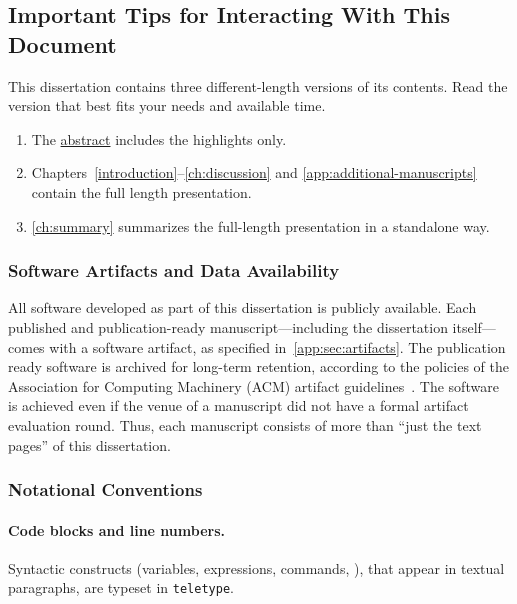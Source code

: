 \subsection{Important Tips for Interacting With This Document}
\label{subsec:tips}

This dissertation contains three different-length versions of its contents.
Read the version that best fits your needs and available time.

\begin{mdframed}[backgroundcolor=priorbase,linecolor=cc]
\begin{enumerate}[wide, labelwidth=!, labelindent=0pt]
\item The \hyperref[abs]{abstract} includes the highlights only.
\item Chapters~\ref{introduction}--\ref{ch:discussion} and \ref{app:additional-manuscripts} contain the full length presentation.
\item \autoref{ch:summary} summarizes the full-length presentation in a standalone way.
\end{enumerate}
\end{mdframed}

\subsubsection{Software Artifacts and Data Availability}\label{subsub:sw}

All software developed as part of this dissertation is publicly available.
Each published and publication-ready manuscript---including the dissertation itself---comes with a software artifact, as specified in~\autoref{app:sec:artifacts}.
The publication ready software is archived for long-term retention, according to the policies of the Association for Computing Machinery (ACM) artifact guidelines~\cite{acm_badging}.
The software is achieved even if the venue of a manuscript did not have a formal artifact evaluation round.
Thus, each manuscript consists of more than \enquote{just the text pages} of this dissertation.

\subsubsection{Notational Conventions}

\paragraph*{Code blocks and line numbers.}
Syntactic constructs (variables, expressions, commands, \etc), that appear in textual paragraphs, are typeset in \texttt{teletype}.

